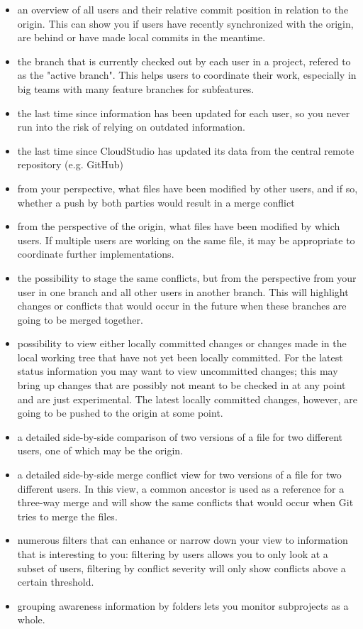 \begin{itemize}


\item an overview of all users and their relative commit position in relation to the origin. This can show you if users have recently synchronized with the origin, are behind or have made local commits in the meantime.
\item the branch that is currently checked out by each user in a project, refered to as the "active branch". This helps users to coordinate their work, especially in big teams with many feature branches for subfeatures.
\item the last time since information has been updated for each user, so you never run into the risk of relying on outdated information.
\item the last time since CloudStudio has updated its data from the central remote repository (e.g. GitHub)
\item from your perspective, what files have been modified by other users, and if so, whether a push by both parties would result in a merge conflict
\item from the perspective of the origin, what files have been modified by which users. If multiple users are working on the same file, it may be appropriate to coordinate further implementations.
\item the possibility to stage the same conflicts, but from the perspective from your user in one branch and all other users in another branch. This will highlight changes or conflicts that would occur in the future when these branches are going to be merged together.
\item possibility to view either locally committed changes or changes made in the local working tree that have not yet been locally committed. For the latest status information you may want to view uncommitted changes; this may bring up changes that are possibly not meant to be checked in at any point and are just experimental. The latest locally committed changes, however, are going to be pushed to the origin at some point.
\item a detailed side-by-side comparison of two versions of a file for two different users, one of which may be the origin.
\item a detailed side-by-side merge conflict view for two versions of a file for two different users. In this view, a common ancestor is used as a reference for a three-way merge and will show the same conflicts that would occur when Git tries to merge the files.
\item numerous filters that can enhance or narrow down your view to information that is interesting to you: filtering by users allows you to only look at a subset of users, filtering by conflict severity will only show conflicts above a certain threshold.
\item grouping awareness information by folders lets you monitor subprojects as a whole.

\end{itemize}



